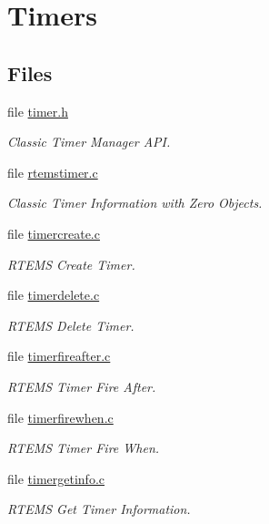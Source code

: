 \hypertarget{group__ClassicTimer}{}\section{Timers}
\label{group__ClassicTimer}
\subsection*{Files}
\begin{DoxyCompactItemize}
\item 
file \mbox{\hyperlink{cpukit_2include_2rtems_2rtems_2timer_8h}{timer.\+h}}
\begin{DoxyCompactList}\small\item\em Classic Timer Manager A\+PI. \end{DoxyCompactList}\item 
file \mbox{\hyperlink{rtemstimer_8c}{rtemstimer.\+c}}
\begin{DoxyCompactList}\small\item\em Classic Timer Information with Zero Objects. \end{DoxyCompactList}\item 
file \mbox{\hyperlink{timercreate_8c}{timercreate.\+c}}
\begin{DoxyCompactList}\small\item\em R\+T\+E\+MS Create Timer. \end{DoxyCompactList}\item 
file \mbox{\hyperlink{timerdelete_8c}{timerdelete.\+c}}
\begin{DoxyCompactList}\small\item\em R\+T\+E\+MS Delete Timer. \end{DoxyCompactList}\item 
file \mbox{\hyperlink{timerfireafter_8c}{timerfireafter.\+c}}
\begin{DoxyCompactList}\small\item\em R\+T\+E\+MS Timer Fire After. \end{DoxyCompactList}\item 
file \mbox{\hyperlink{timerfirewhen_8c}{timerfirewhen.\+c}}
\begin{DoxyCompactList}\small\item\em R\+T\+E\+MS Timer Fire When. \end{DoxyCompactList}\item 
file \mbox{\hyperlink{timergetinfo_8c}{timergetinfo.\+c}}
\begin{DoxyCompactList}\small\item\em R\+T\+E\+MS Get Timer Information. \end{DoxyCompactList}\item 

\end{DoxyCompactItemize}
